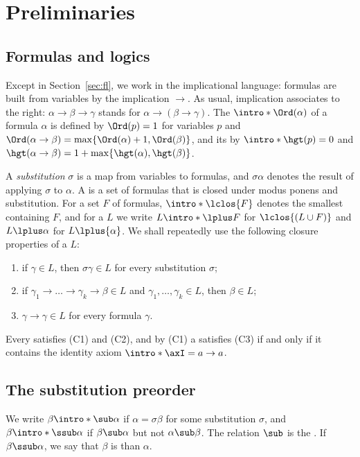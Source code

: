 \section{Preliminaries}\label{sec:prelim}

\subsection{Formulas and logics}

Except in Section~\ref{sec:fl}, we work in the implicational language:
formulas are built from variables by the implication $\to$. As usual,
implication associates to the right: $\alpha\to\beta\to\gamma$ stands for
$\alpha\to(\beta\to\gamma)$. \AP The  $\intro*\Ord(\alpha)$ of
a formula $\alpha$ is defined by $\Ord(p)=1$ for variables $p$ and
$\Ord(\alpha\to\beta)=\max\{\Ord(\alpha)+1,\Ord(\beta)\}$, and its
 by $\intro*\hgt(p)=0$ and
$\hgt(\alpha\to\beta)=1+\max\{\hgt(\alpha),\hgt(\beta)\}$.

A \emph{substitution} $\sigma$ is a map from variables to formulas, and
$\sigma\alpha$ denotes the result of applying $\sigma$ to $\alpha$.
\AP A  is a set of formulas
that is closed under modus ponens and substitution. For a set $F$ of
formulas, $\intro*\lclos{F}$ denotes the smallest  containing
$F$, and for a  $L$ we write $L\intro*\lplus F$ for
$\lclos{(L\cup F)}$ and $L\lplus\alpha$ for $L\lplus\{\alpha\}$. We shall
repeatedly use the following closure properties of a  $L$:
\begin{enumerate}
\item[(C1)] if $\gamma\in L$, then $\sigma\gamma\in L$ for every
  substitution $\sigma$;
\item[(C2)] if $\gamma_1\to\dots\to\gamma_k\to\beta\in L$ and
  $\gamma_1,\dots,\gamma_k\in L$, then $\beta\in L$;
\item[(C3)] $\gamma\to\gamma\in L$ for every formula $\gamma$.
\end{enumerate}
Every  satisfies (C1) and (C2), and by (C1) a 
satisfies (C3) if and only if it contains the identity axiom
$\intro*\axI=a\to a$.

\subsection{The substitution preorder}

\AP We write $\beta\intro*\sub\alpha$ if $\alpha=\sigma\beta$ for some
substitution $\sigma$, and $\beta\intro*\ssub\alpha$ if $\beta\sub\alpha$
but not $\alpha\sub\beta$. The relation $\sub$ is the
. If $\beta\ssub\alpha$, we say that $\beta$
is  than $\alpha$.

